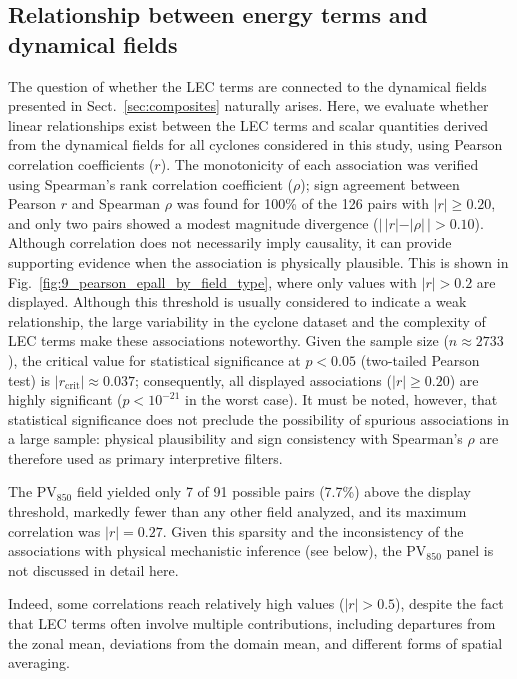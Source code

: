 
\subsection{Relationship between energy terms and dynamical fields}
\label{sec:correlation}

The question of whether the LEC terms are connected to the dynamical fields presented
in Sect.~\ref{sec:composites} naturally arises. Here, we evaluate whether linear
relationships exist between the LEC terms and scalar quantities derived from the
dynamical fields for all cyclones considered in this study, using Pearson correlation
coefficients ($r$). The monotonicity of each association was verified using
Spearman's rank correlation coefficient ($\rho$); sign agreement between Pearson $r$
and Spearman $\rho$ was found for 100\% of the 126 pairs with $|r| \geq 0.20$, and
only two pairs showed a modest magnitude divergence ($|\,|r| - |\rho|\,| > 0.10$).
Although correlation does not necessarily imply causality, it can provide supporting
evidence when the association is physically plausible. This is shown in
Fig.~\ref{fig:9_pearson_epall_by_field_type}, where only values with $|r| > 0.2$ are
displayed. Although this threshold is usually considered to indicate a weak relationship,
the large variability in the cyclone dataset and the complexity of LEC terms make these
associations noteworthy. Given the sample size ($n \approx 2733$), the critical value
for statistical significance at $p < 0.05$ (two-tailed Pearson test) is
$|r_{\mathrm{crit}}| \approx 0.037$; consequently, all displayed associations
($|r| \geq 0.20$) are highly significant ($p < 10^{-21}$ in the worst case). It must
be noted, however, that statistical significance does not preclude the possibility of
spurious associations in a large sample: physical plausibility and sign consistency
with Spearman's $\rho$ are therefore used as primary interpretive filters.

The $\mathrm{PV}_{850}$ field yielded only 7 of 91 possible pairs (7.7\%) above the
display threshold, markedly fewer than any other field analyzed, and its maximum
correlation was $|r| = 0.27$. Given this sparsity and the inconsistency of the
associations with physical mechanistic inference (see below), the
$\mathrm{PV}_{850}$ panel is not discussed in detail here.

Indeed, some correlations reach relatively high values ($|r| > 0.5$), despite the fact
that LEC terms often involve multiple contributions, including departures from the zonal
mean, deviations from the domain mean, and different forms of spatial averaging.

